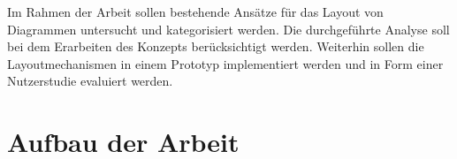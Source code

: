 
Im Rahmen der Arbeit sollen bestehende Ansätze für das Layout von Diagrammen untersucht und kategorisiert werden. Die durchgeführte Analyse soll bei dem Erarbeiten des Konzepts berücksichtigt werden. Weiterhin sollen die Layoutmechanismen in einem Prototyp implementiert werden und in Form einer Nutzerstudie evaluiert werden.


\section{Aufbau der Arbeit}















